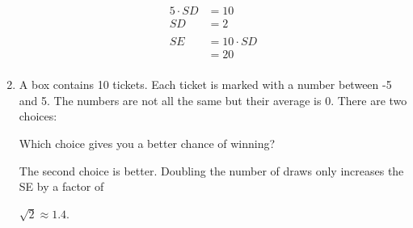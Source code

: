\documentclass[portrait]{exam}
\begin{document}
\begin{enumerate}
\begin{solution}
        \begin{align*}
          5 \cdot SD & = 10 \\
          SD   & = 2 \\
          \\
          SE   & = 10 \cdot SD \\
               & = 20 \\
        \end{align*}
        
      \end{solution}

    \item A box contains 10 tickets. Each ticket is marked with a number between
      -5 and 5. The numbers are not all the same but their average is 0. There
      are two choices:

      Which choice gives you a better chance of winning?

      \begin{solution}
        The second choice is better.  Doubling the number of draws only
        increases the SE by a factor of

        $\sqrt{2} \approx 1.4$. 





\end{solution}
\end{enumerate}
\end{document}
